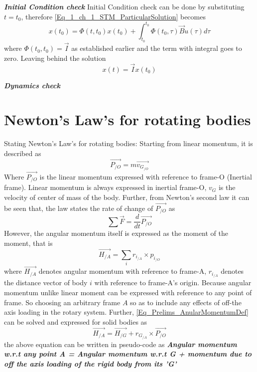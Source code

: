 \textbf{\textit{Initial Condition check}}
Initial Condition check can be done by substituting $t = t_{0}$, therefore \eqref{Eq_1_ch_1_STM_ParticularSolution} becomes
\begin{equation} 
x(t_{0}) = \Phi(t, t_{0}) x(t_{0}) + \int_{t_{0}}^{t_{0}} \Phi(t_{0}, \tau) \vec{B}u(\tau)d\tau
\end{equation}
where $\Phi(t_{0}, t_{0}) = \vec{I}$ as established earlier and the term with integral goes to zero. Leaving behind the solution
\begin{equation} 
x(t) = \vec{I} x(t_{0})
\end{equation}

\textbf{\textit{Dynamics check}}


\section{Newton's Law's for rotating bodies}

Stating Newton's Law's for rotating bodies:
Starting from linear momentum, it is described as 
\begin{equation}
\vec{P_{/O}} = m \vec{v_{G_{/O}}}
\end{equation}
Where $\vec{P_{/O}}$ is the linear momentum expressed with reference to frame-O (Inertial frame). Linear momentum is always expressed in inertial frame-O, $v_{G}$ is the velocity of center of mass of the body. Further, from Newton's second law it can be seen that, the law states the rate of change of $\vec{P_{/O}}$ as
\begin{equation}
\sum \vec{F} = \frac{d}{dt}\vec{P_{/O}}
\end{equation}
However, the angular momentum itself is expressed as the moment of the moment, that is
\begin{equation}\label{Eq_Prelims_AnularMomentumDef}
\vec{H_{/A}} = \sum_{i}^{} r_{i_{/A}} \times p_{i_{/O}}
\end{equation}
where $\vec{H_{/A}}$ denotes angular momentum with reference to frame-A, $r_{i_{/A}}$ denotes the distance vector of body $i$ with reference to frame-A's origin. Because angular momentum unlike linear moment can be expressed with reference to any point of frame. So choosing an arbitrary frame $A$ so as to include any effects of off-the axis loading in the rotary system. Further, \eqref{Eq_Prelims_AnularMomentumDef} can be solved and expressed for solid bodies as
\begin{equation} \label{Eq_Prelims_AngularMomentumFormula}
	\vec{H_{/A}} = \vec{H_{/G}} + r_{G_{/A}} \times \vec{P_{/O}}
\end{equation}
the above equation can be written in pseudo-code as
\textbf{\textit{Angular momentum w.r.t any point A = Angular momentum w.r.t G + momentum due to off the axis loading of the rigid body from its 'G'}}

